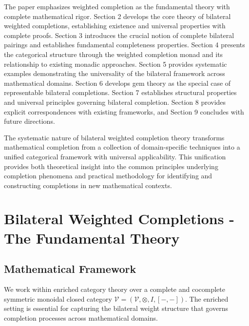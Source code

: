 \documentclass[11pt]{article}
\theoremstyle{plain}
\theoremstyle{definition}
\theoremstyle{remark}
\newcommand{\V}{\mathcal{V}}
\newcommand{\tensor}{\otimes}
\begin{document}
The paper emphasizes weighted completion as the fundamental theory with complete mathematical rigor. Section 2 develops the core theory of bilateral weighted completions, establishing existence and universal properties with complete proofs. Section 3 introduces the crucial notion of complete bilateral pairings and establishes fundamental completeness properties. Section 4 presents the categorical structure through the weighted completion monad and its relationship to existing monadic approaches. Section 5 provides systematic examples demonstrating the universality of the bilateral framework across mathematical domains. Section 6 develops gem theory as the special case of representable bilateral completions. Section 7 establishes structural properties and universal principles governing bilateral completion. Section 8 provides explicit correspondences with existing frameworks, and Section 9 concludes with future directions.

The systematic nature of bilateral weighted completion theory transforms mathematical completion from a collection of domain-specific techniques into a unified categorical framework with universal applicability. This unification provides both theoretical insight into the common principles underlying completion phenomena and practical methodology for identifying and constructing completions in new mathematical contexts.

\section{Bilateral Weighted Completions - The Fundamental Theory}

\subsection{Mathematical Framework}

We work within enriched category theory over a complete and cocomplete symmetric monoidal closed category $\V = (\V, \tensor, I, [-,-])$. The enriched setting is essential for capturing the bilateral weight structure that governs completion processes across mathematical domains.
\end{document}

